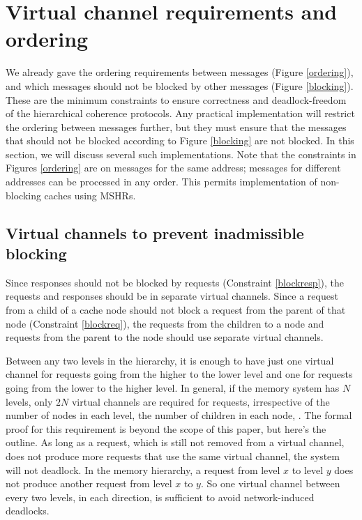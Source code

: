 \section{Virtual channel requirements and ordering}
\label{sec:orderingBlocking}

\newcommand{\fourAngle}[6]{\text{$#1\langle#2\rightarrow#3,#4,#5\rightarrow#6\rangle$}}
\newcommand{\threeAngle}[5]{\text{$#1\langle#2\rightarrow#3,#4,#5\rangle$}}

\newcommand{\Req}[5]{\fourAngle{Req}{#1}{#2}{#3}{#4}{#5}}
\newcommand{\Resp}[5]{\fourAngle{Resp}{#1}{#2}{#3}{#4}{#5}}
\newcommand{\RespOld}[4]{\threeAngle{Resp}{#1}{#2}{#3}{#4}}

We already gave the ordering requirements between messages (Figure
\ref{ordering}), and which messages should not be blocked by other
messages (Figure \ref{blocking}). These are the minimum constraints to
ensure correctness and deadlock-freedom of the hierarchical coherence
protocols. Any practical implementation will restrict the ordering between
messages further, but they must ensure that the messages that should not be
blocked according to Figure \ref{blocking} are not blocked. In this
section, we will discuss several such implementations. Note that the
constraints in Figures \ref{ordering} are on messages for the same
address; messages for different addresses can be processed in any order. This
permits implementation of non-blocking caches using MSHRs.
 
\subsection{Virtual channels to prevent inadmissible blocking}

Since responses should not be blocked by requests (Constraint \ref{blockresp}),
the requests and responses should be in separate virtual channels. Since a
request from a child of a cache node should not block a request from the parent
of that node (Constraint \ref{blockreq}), the requests from the children to a
node and requests from the parent to the node should use separate virtual
channels.

Between any two levels in the hierarchy, it is enough to have just one virtual
channel for requests going from the higher to the lower level and one for
requests going from the lower to the higher level. %
In general, if the memory system has $N$ levels, only $2N$ virtual channels are
required for requests, irrespective of the number of nodes in each level, the
number of children in each node, \etc. The formal proof for this requirement is
beyond the scope of this paper, but here's the outline. As long as a request,
which is still not removed from a virtual channel, does not produce more
requests that use the same virtual channel, the system will not deadlock. In
the memory hierarchy, a request from level $x$ to level $y$ does not produce
another request from level $x$ to $y$. So one virtual channel between every two
levels, in each direction, is sufficient to avoid network-induced deadlocks.

